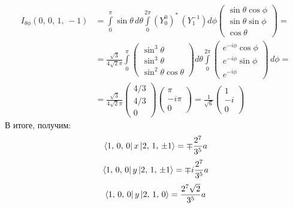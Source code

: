 \begin{align*}
    I_{\theta\phi}(0,\,0,\,1,\,-1) &= \int\limits_{0}^{\pi}\sin\theta\,d\theta\int\limits_{0}^{2\pi}(Y^0_0)^* \, (Y^{-1}_1) d\phi \begin{pmatrix} \sin\theta\cos\phi \\ \sin\theta\sin\phi \\ \cos\theta \end{pmatrix} = \\& = \frac{\sqrt{3}}{4\sqrt{2}\pi} \int\limits_0^{\pi} \begin{pmatrix} \sin^3 \theta \\ \sin^3\theta \\ \sin^2\theta\cos\theta \end{pmatrix} d\theta \int\limits_{0}^{2\pi} \begin{pmatrix} e^{-i\phi}\cos\phi \\ e^{-i\phi}\sin\phi \\ e^{-i\phi} \end{pmatrix} \, d\phi = \\& = \frac{\sqrt{3}}{4\sqrt{2}\pi} \begin{pmatrix} 4/3 \\ 4/3 \\ 0 \end{pmatrix} \begin{pmatrix} \pi \\ -i\pi \\ 0 \end{pmatrix} = \frac{1}{\sqrt{6}} \begin{pmatrix} 1 \\ -i \\ 0 \end{pmatrix}
\end{align*}
В итоге, получим:
\[
 \bra{1,\, 0,\, 0}x\ket{2,\, 1,\, \pm 1} = \mp \frac{2^7}{3^5}a
\]
\[
 \bra{1,\, 0,\, 0}y\ket{2,\, 1,\, \pm 1} = \mp i\frac{2^7}{3^5}a
\]
\[
 \bra{1,\, 0,\, 0}y\ket{2,\, 1,\,  0} = \frac{2^7 \sqrt{2}}{3^5}a
\]
